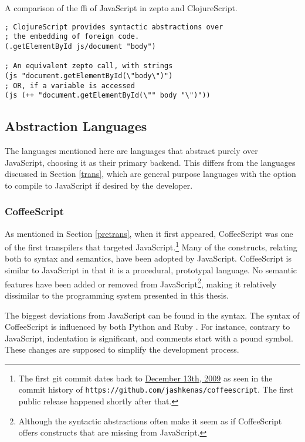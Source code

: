 \documentclass[oneside,11pt,xetex]{scrbook}
\begin{document}
\begin{listing}[H]
\caption{A comparison of the \gls{ffi} of JavaScript in zepto and ClojureScript.}
\begin{verbatim}
; ClojureScript provides syntactic abstractions over
; the embedding of foreign code.
(.getElementById js/document "body")

; An equivalent zepto call, with strings
(js "document.getElementById(\"body\")")
; OR, if a variable is accessed
(js (++ "document.getElementById(\"" body "\")"))
\end{verbatim}
\end{listing}

\subsection{Abstraction Languages}

The languages mentioned here are languages that abstract purely over JavaScript,
choosing it as their primary backend. This differs from the languages discussed
in Section \ref{trans}, which are general purpose languages with the option to compile
to JavaScript if desired by the developer.

\subsubsection{CoffeeScript}

As mentioned in Section \ref{pretrans}, when it first appeared, CoffeeScript was one of the first transpilers that targeted JavaScript.\footnote{The first git commit
dates back to
\href{https://github.com/jashkenas/coffeescript/commit/8e9d637985d2dc9b44922076ad54ffef7fa8e9c2}{December 13th, 2009} as seen in the
commit history of \texttt{https://github.com/jashkenas/coffeescript}.
The first public release happened shortly after that.} Many of the constructs,
relating both to syntax and semantics, have been adopted by JavaScript.
CoffeeScript is similar to JavaScript in that it is a procedural, prototypal
language. No semantic features have been added or removed from JavaScript\footnote{Although
the syntactic abstractions often make it seem as if CoffeeScript offers
constructs that are missing from JavaScript.}, making it relatively
dissimilar to the programming system presented in this thesis.

The biggest deviations from JavaScript can be found in the syntax.
The syntax of CoffeeScript is influenced by both Python and Ruby \parencite{COFF}.
For instance, contrary to JavaScript, indentation is significant, and
comments start with a pound symbol. These changes are supposed to simplify
the development process.
\end{document}
